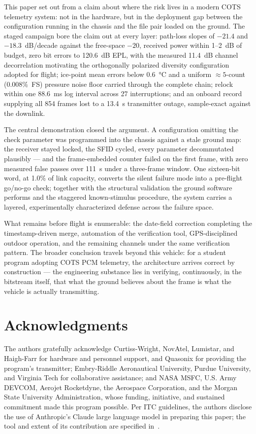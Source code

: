 \documentclass[12pt,letterpaper]{article}
\begin{document}
This paper set out from a claim about where the risk lives in a modern
COTS telemetry system: not in the hardware, but in the deployment gap
between the configuration running in the chassis and the file pair loaded
on the ground. The staged campaign bore the claim out at every layer:
path-loss slopes of $-21.4$ and $-18.3$~dB/decade against the free-space
$-20$, received power within 1--2~dB of budget, zero bit errors to
120.6~dB EPL, with the measured 11.4~dB channel decorrelation motivating
the orthogonally polarized diversity configuration adopted for flight;
ice-point mean errors below 0.6~\si{\celsius} and a uniform
${\approx}5$-count (0.008\%~FS) pressure noise floor carried through
the complete chain; relock within one 88.6~ms log interval across 27
interruptions; and an onboard record supplying all 854 frames lost to a
13.4~s transmitter outage, sample-exact against the downlink.

The central demonstration closed the argument. A configuration omitting
the check parameter was programmed into the chassis against a stale
ground map: the receiver stayed locked, the SFID cycled, every parameter
decommutated plausibly --- and the frame-embedded counter failed on the
first frame, with zero measured false passes over 111~s under a
three-frame window. One sixteen-bit word, at 1.0\% of link capacity,
converts the silent failure mode into a pre-flight go/no-go check;
together with the structural validation the ground software performs and
the staggered known-stimulus procedure, the system carries a layered,
experimentally characterized defense across the failure space.

What remains before flight is enumerable: the date-field correction
completing the timestamp-driven merge, automation of the verification
tool, GPS-disciplined outdoor operation, and the remaining channels under
the same verification pattern. The broader conclusion travels beyond this
vehicle: for a student program adopting COTS PCM telemetry, the
architecture arrives correct by construction --- the engineering
substance lies in verifying, continuously, in the bitstream itself, that
what the ground believes about the frame is what the vehicle is actually
transmitting.

\section{Acknowledgments}

The authors gratefully acknowledge Curtiss-Wright, NovAtel, Lumistar, and
Haigh-Farr for hardware and personnel support, and Quasonix for providing
the program's transmitter; Embry-Riddle Aeronautical University, Purdue
University, and Virginia Tech for collaborative assistance; and NASA MSFC,
U.S. Army DEVCOM, Aerojet Rocketdyne, the Aerospace Corporation, and the
Morgan State University Administration, whose funding, initiative, and
sustained commitment made this program possible. Per ITC guidelines, the authors disclose the use of Anthropic's Claude
large language model in preparing this paper; the tool and extent of its
contribution are specified in~\cite{claude2026}.

{\footnotesize
\setlength{\bibsep}{0.5pt plus 0.5pt}

}
\end{document}
